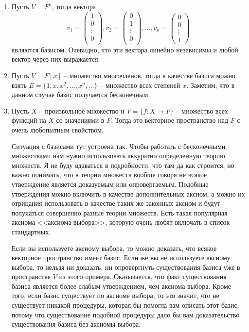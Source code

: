 \begin{enumerate}
\item Пусть $V = F^n$, тогда вектора
\[
v_1 = 
\begin{pmatrix}
{1}\\{0}\\{\vdots}\\{0}\\
\end{pmatrix},
v_2 = 
\begin{pmatrix}
{0}\\{1}\\{\vdots}\\{0}\\
\end{pmatrix},
\ldots,
v_n = 
\begin{pmatrix}
{0}\\{0}\\{\vdots}\\{1}
\end{pmatrix}
\]
являются базисом.
Очевидно, что эти вектора линейно независимы и любой вектор через них выражается.

\item Пусть $V = F[x]$ -- множество многочленов, тогда в качестве базиса можно взять $E = \{1,x,x^2, \ldots , x^n,\ldots\}$ -- множество всех степеней $x$.
Заметим, что в данном случае базис получается бесконечным.

\item Пусть $X$ -- произвольное множество и $V = \{f\colon X\to F\}$ -- множество всех функций на $X$ со значениями в $F$.
Тогда это векторное пространство над $F$ с очень любопытным свойством.

Ситуация с базисами тут устроена так.
Чтобы работать с бесконечными множествами нам нужно использовать аккуратно определенную теорию множеств.
Я не буду вдаваться в подробности, что там да как строится, но важно понимать, что в теории множеств вообще говоря не всякое утверждение является доказуемым или опровергаемым.
Подобные утверждения можно включить в качестве дополнительных аксиом, а можно их отрицания использовать в качестве таких же законных аксиом и будут получаться совершенно разные теории множеств.
Есть такая популярная аксиома <<аксиома выбора>>, которую очень любят включать в список стандартных.

Если вы используете аксиому выбора, то можно доказать, что всякое векторное пространство имеет базис.
Если же вы не используете аксиому выбора, то нельзя ни доказать, ни опровергнуть существования базиса уже в пространстве $V$ из этого примера.
Оказывается, что факт существования базиса является более слабым утверждением, чем аксиома выбора.
Кроме того, если базис существует по аксиоме выбора, то это значит, что не существует никакой процедуры, которая бы помогла вам описать этот базис, потому что существование подобной процедуры дало бы вам доказательство существования базиса без аксиомы выбора.
\end{enumerate}

